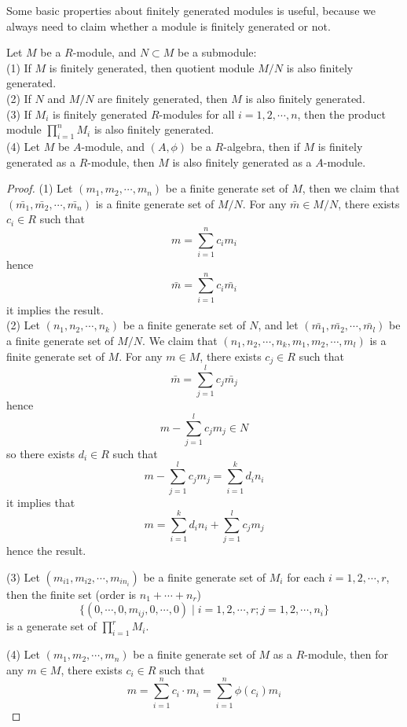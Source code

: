 \documentclass[12pt,a4paper]{article}
\begin{document}
Some basic properties about finitely generated modules is useful, because we always need to claim whether a module is finitely generated or not.
\begin{proposition} \label{typefini}
Let \(M\) be a \(R\)-module, and \(N \subset M\) be a submodule:\\
(1) If \(M\) is finitely generated, then quotient module \(M/N\) is also finitely generated.\\

(2) If \(N\) and \(M/N\) are finitely generated, then \(M\) is also finitely generated.\\

(3) If \(M_i\) is finitely generated \(R\)-modules for all \(i=1,2,\cdots, n\), then the product module \(\prod_{i=1}^n M_i\) is also finitely generated.\\

(4) Let \(M\) be \(A\)-module, and \((A,\phi)\) be a \(R\)-algebra, then if \(M\) is finitely generated as a \(R\)-module, then \(M\) is also finitely generated as a \(A\)-module.
\end{proposition}
\begin{proof}
    (1) Let \((m_1, m_2, \cdots, m_n)\) be a finite generate set of \(M\), then we claim that \((\bar{m_1}, \bar{m_2}, \cdots, \bar{m_n})\) is a finite generate set of \(M/N\). For any \(\bar{m} \in M/N\), there exists \(c_i \in R\) such that
    \[m = \sum_{i=1}^n c_i m_i\]
    hence
    \[\bar{m} = \sum_{i=1}^n c_i \bar{m_i}\]
    it implies the result.\\
    (2) Let \((n_1, n_2, \cdots, n_k)\) be a finite generate set of \(N\), and let \((\bar{m_1}, \bar{m_2}, \cdots, \bar{m_l})\) be a finite generate set of \(M/N\). We claim that \((n_1, n_2, \cdots, n_k, m_1, m_2, \cdots, m_l)\) is a finite generate set of \(M\). For any \(m \in M\), there exists \(c_j \in R\) such that
    \[\bar{m} = \sum_{j=1}^l c_j \bar{m_j}\]
    hence
    \[m - \sum_{j=1}^l c_j m_j \in N\]
    so there exists \(d_i \in R\) such that
    \[m - \sum_{j=1}^l c_j m_j = \sum_{i=1}^k d_i n_i\]
    it implies that
    \[m = \sum_{i=1}^k d_i n_i + \sum_{j=1}^l c_j m_j\]
    hence the result.

    (3) Let \((m_{i1}, m_{i2}, \cdots, m_{in_i})\) be a finite generate set of \(M_i\) for each \(i=1,2,\cdots,r\), then the finite set (order is \(n_1+\cdots+n_r\))
    \[\{(0,\cdots,0,m_{ij},0,\cdots,0) \mid i=1,2,\cdots,r; j=1,2,\cdots,n_i\}\]
    is a generate set of \(\prod_{i=1}^r M_i\).

    (4) Let \((m_1, m_2, \cdots, m_n)\) be a finite generate set of \(M\) as a \(R\)-module, then for any \(m \in M\), there exists \(c_i \in R\) such that
    \[m = \sum_{i=1}^n c_i \cdot m_i = \sum_{i=1}^n \phi(c_i) m_i\]
\end{proof}
\end{document}
